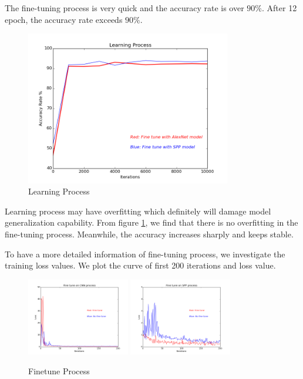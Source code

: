 The fine-tuning process is very quick and the accuracy rate is over $90\%$. After 12 epoch, the accuracy rate exceeds $90\%$. 
\graphicspath{ {./Figures/} }
\begin{figure}[!htb]
    \centering
	\includegraphics[width=0.8\textwidth]{FinetuneAccuracy.png}
    \caption{Learning Process}%
    \label{fig:finetuneprocess}%
\end{figure}

Learning process may have overfitting which definitely will damage model generalization capability. From figure \ref{fig:finetuneprocess}, we find that there is no overfitting in the fine-tuning process. Meanwhile, the accuracy increases sharply and keeps stable.

To have a more detailed information of fine-tuning process, we investigate the training loss values. We plot the curve of first 200 iterations and loss value.

\begin{figure}[!htb]
    \centering
	\includegraphics[width=0.4\textwidth]{finetuneCNNProcess.png}
	\includegraphics[width=0.4\textwidth]{finetuneSPPProcess.png}
    \caption{Finetune Process}%
    \label{fig:FTvsSC}%
\end{figure}

